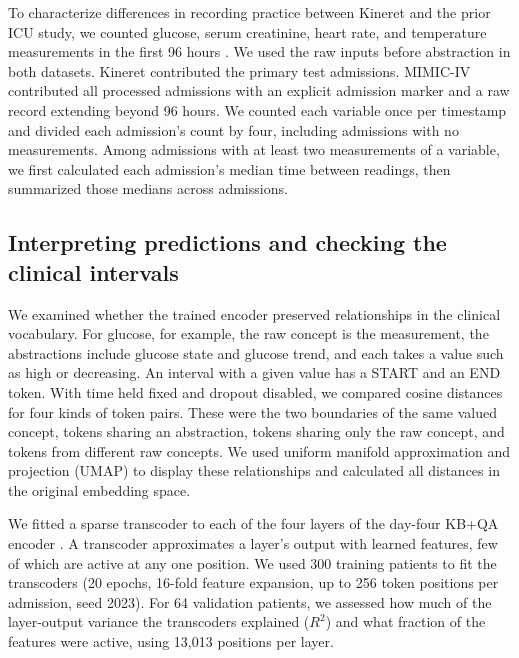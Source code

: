 To characterize differences in recording practice between Kineret and the prior ICU study, we counted glucose, serum creatinine, heart rate, and temperature measurements in the first 96 hours \citep{oded2026intervene}. We used the raw inputs before abstraction in both datasets. Kineret contributed the primary test admissions. MIMIC-IV contributed all processed admissions with an explicit admission marker and a raw record extending beyond 96 hours. We counted each variable once per timestamp and divided each admission's count by four, including admissions with no measurements. Among admissions with at least two measurements of a variable, we first calculated each admission's median time between readings, then summarized those medians across admissions.

\subsection{Interpreting predictions and checking the clinical intervals}
We examined whether the trained encoder preserved relationships in the clinical vocabulary. For glucose, for example, the raw concept is the measurement, the abstractions include glucose state and glucose trend, and each takes a value such as high or decreasing. An interval with a given value has a START and an END token. With time held fixed and dropout disabled, we compared cosine distances for four kinds of token pairs. These were the two boundaries of the same valued concept, tokens sharing an abstraction, tokens sharing only the raw concept, and tokens from different raw concepts. We used uniform manifold approximation and projection (UMAP) to display these relationships and calculated all distances in the original embedding space.

We fitted a sparse transcoder to each of the four layers of the day-four KB+QA encoder \citep{dunefsky2024transcoders,rajamanoharan2024jumping}. A transcoder approximates a layer's output with learned features, few of which are active at any one position. We used 300 training patients to fit the transcoders (20 epochs, 16-fold feature expansion, up to 256 token positions per admission, seed 2023). For 64 validation patients, we assessed how much of the layer-output variance the transcoders explained ($R^2$) and what fraction of the features were active, using 13,013 positions per layer.

